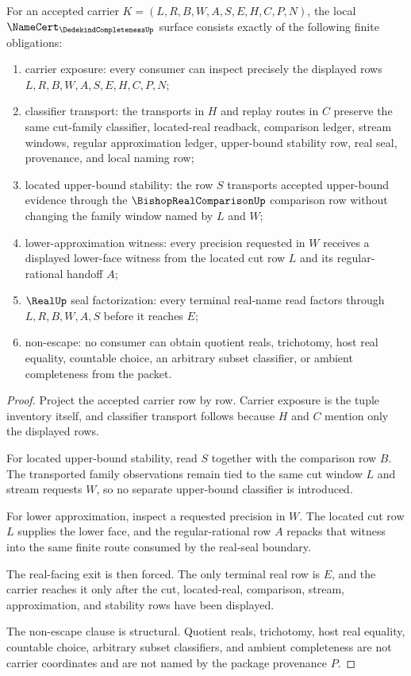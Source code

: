 \begin{theorem}
\label{thm:dedekind-completeness-namecert-obligations}
For an accepted carrier $K=(L,R,B,W,A,S,E,H,C,P,N)$, the local $\NameCert_{\DedekindCompletenessUp}$ surface consists exactly of the following finite obligations:
\begin{enumerate}
\item carrier exposure: every consumer can inspect precisely the displayed rows $L,R,B,W,A,S,E,H,C,P,N$;
\item classifier transport: the transports in $H$ and replay routes in $C$ preserve the same cut-family classifier, located-real readback, comparison ledger, stream windows, regular approximation ledger, upper-bound stability row, real seal, provenance, and local naming row;
\item located upper-bound stability: the row $S$ transports accepted upper-bound evidence through the $\BishopRealComparisonUp$ comparison row without changing the family window named by $L$ and $W$;
\item lower-approximation witness: every precision requested in $W$ receives a displayed lower-face witness from the located cut row $L$ and its regular-rational handoff $A$;
\item $\RealUp$ seal factorization: every terminal real-name read factors through $L,R,B,W,A,S$ before it reaches $E$;
\item non-escape: no consumer can obtain quotient reals, trichotomy, host real equality, countable choice, an arbitrary subset classifier, or ambient completeness from the packet.
\end{enumerate}
\end{theorem}
\begin{proof}
Project the accepted carrier row by row. Carrier exposure is the tuple inventory itself, and classifier transport follows because $H$ and $C$ mention only the displayed rows.

For located upper-bound stability, read $S$ together with the comparison row $B$. The transported family observations remain tied to the same cut window $L$ and stream requests $W$, so no separate upper-bound classifier is introduced.

For lower approximation, inspect a requested precision in $W$. The located cut row $L$ supplies the lower face, and the regular-rational row $A$ repacks that witness into the same finite route consumed by the real-seal boundary.

The real-facing exit is then forced. The only terminal real row is $E$, and the carrier reaches it only after the cut, located-real, comparison, stream, approximation, and stability rows have been displayed.

The non-escape clause is structural. Quotient reals, trichotomy, host real equality, countable choice, arbitrary subset classifiers, and ambient completeness are not carrier coordinates and are not named by the package provenance $P$.
\end{proof}

